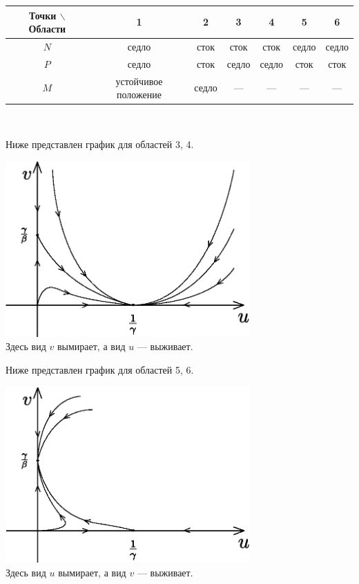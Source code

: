 \begin{center}
\begin{tabular}{|c|c|c|c|c|c|c|}
\hline
Точки $\backslash$ Области & 1 & 2 & 3 & 4 & 5 & 6 \\ \hline
$N$ & седло & сток & сток & сток & седло & седло\\ \hline
$P$ & седло & сток & седло & седло & сток & сток\\ \hline
$M$ & устойчивое положение & седло & --- & --- & --- & --- \\ \hline
\end{tabular}\\[8pt]
\end{center}
Ниже представлен график для областей 3, 4.
\begin{center}
\includegraphics[width = 0.7\textwidth]{ch6/system(34).eps}\\[8pt]
Здесь вид $v$ вымирает, а вид $u$ --- выживает.\\[20pt]
\end{center}
Ниже представлен график для областей 5, 6.
\begin{center}
\includegraphics[width = 0.7\textwidth]{ch6/system(56).eps}\\
Здесь вид $u$ вымирает, а вид $v$ --- выживает.
\end{center}
